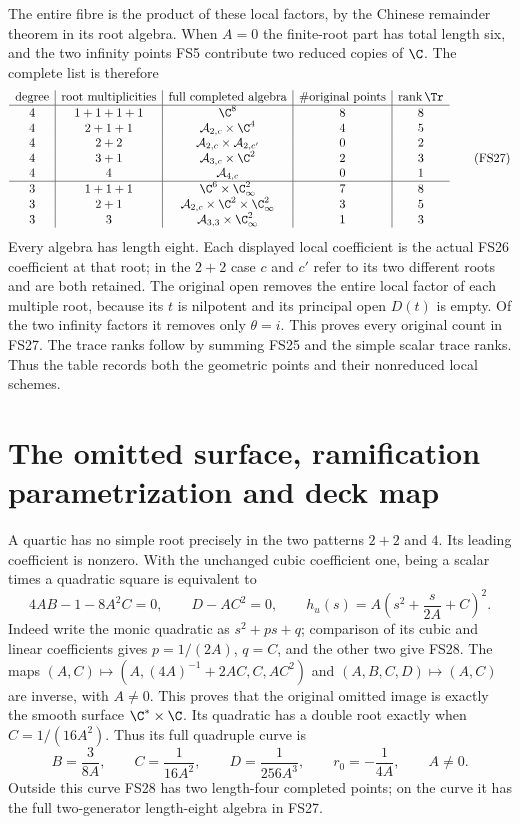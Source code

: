 The entire fibre is the product of these local factors,
by the Chinese remainder theorem in its root algebra.
When $A=0$ the finite-root part has total length six,
and the two infinity points FS5 contribute two reduced
copies of $\C$. The complete list is therefore
\begin{equation}
\begin{array}{c|c|c|c|c}
\text{degree}&\text{root multiplicities}&\text{full completed algebra}
 &\#\text{original points}&\operatorname{rank}\Tr\\\hline
4&1+1+1+1&\C^8&8&8\\
4&2+1+1&\mathcal A_{2,c}\times\C^4&4&5\\
4&2+2&\mathcal A_{2,c}\times\mathcal A_{2,c'}&0&2\\
4&3+1&\mathcal A_{3,c}\times\C^2&2&3\\
4&4&\mathcal A_{4,c}&0&1\\\hline
3&1+1+1&\C^6\times\C^2_\infty&7&8\\
3&2+1&\mathcal A_{2,c}\times\C^2\times\C^2_\infty&3&5\\
3&3&\mathcal A_{3,3}\times\C^2_\infty&1&3
\end{array}
\tag{FS27}
\end{equation}
Every algebra has length eight. Each displayed local
coefficient is the actual FS26 coefficient at that root;
in the $2+2$ case $c$ and $c'$ refer to its two different
roots and are both retained. The original open removes
the entire local factor of each multiple root, because
its $t$ is nilpotent and its principal open $D(t)$ is
empty. Of the two infinity factors it removes only
$\theta=i$. This proves every original count in FS27.
The trace ranks follow by summing FS25 and the simple
scalar trace ranks. Thus the table records both the
geometric points and their nonreduced local schemes.

\section{The omitted surface, ramification parametrization and deck map}
A quartic has no simple root precisely in the two
patterns $2+2$ and $4$. Its leading coefficient is
nonzero. With the unchanged cubic coefficient one,
being a scalar times a quadratic square is equivalent to
\begin{equation}
4AB-1-8A^2C=0,\qquad D-AC^2=0,\qquad
h_u(s)=A\left(s^2+\frac{s}{2A}+C\right)^2 .
\tag{FS28}
\end{equation}
Indeed write the monic quadratic as $s^2+ps+q$;
comparison of its cubic and linear coefficients gives
$p=1/(2A)$, $q=C$, and the other two give FS28.
The maps
$(A,C)\mapsto(A,(4A)^{-1}+2AC,C,AC^2)$ and
$(A,B,C,D)\mapsto(A,C)$ are inverse, with $A\ne0$.
This proves that the original omitted image is exactly
the smooth surface $\C^*\times\C$.
Its quadratic has a double root exactly when
$C=1/(16A^2)$. Thus its full quadruple curve is
\begin{equation}
B=\frac3{8A},\qquad C=\frac1{16A^2},\qquad
D=\frac1{256A^3},\qquad r_0=-\frac1{4A},\qquad A\ne0 .
\tag{FS29}
\end{equation}
Outside this curve FS28 has two length-four completed
points; on the curve it has the full two-generator
length-eight algebra in FS27.

